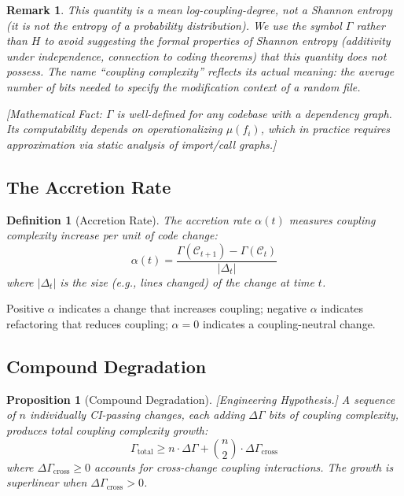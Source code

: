 \documentclass[11pt, a4paper, logo, copyright]{googledeepmind}
\newtheorem{definition}{Definition}[section]
\newtheorem{proposition}{Proposition}[section]
\newtheorem*{remark}{Remark}
\begin{document}
\begin{remark}
This quantity is a mean log-coupling-degree, not a Shannon entropy (it is not the entropy of a probability distribution). We use the symbol $\Gamma$ rather than $H$ to avoid suggesting the formal properties of Shannon entropy (additivity under independence, connection to coding theorems) that this quantity does not possess. The name ``coupling complexity'' reflects its actual meaning: the average number of bits needed to specify the modification context of a random file.
\end{remark}

\emph{[Mathematical Fact: $\Gamma$ is well-defined for any codebase with a dependency graph. Its computability depends on operationalizing $\mu(f_i)$, which in practice requires approximation via static analysis of import/call graphs.]}

\subsection{The Accretion Rate}

\begin{definition}[Accretion Rate]
\label{def:accretion-rate}
The \emph{accretion rate} $\alpha(t)$ measures coupling complexity increase per unit of code change:
\begin{equation}
\alpha(t) = \frac{\Gamma(\mathcal{C}_{t+1}) - \Gamma(\mathcal{C}_t)}{|\Delta_t|}
\end{equation}
where $|\Delta_t|$ is the size (e.g., lines changed) of the change at time $t$.
\end{definition}

Positive $\alpha$ indicates a change that increases coupling; negative $\alpha$ indicates refactoring that reduces coupling; $\alpha = 0$ indicates a coupling-neutral change.

\subsection{Compound Degradation}

\begin{proposition}[Compound Degradation]
\label{thm:compound-degradation}
\emph{[Engineering Hypothesis.]} A sequence of $n$ individually CI-passing changes, each adding $\Delta \Gamma$ bits of coupling complexity, produces total coupling complexity growth:
\begin{equation}
    \Gamma_{\text{total}} \geq n \cdot \Delta \Gamma + \binom{n}{2} \cdot \Delta \Gamma_{\text{cross}}
\end{equation}
where $\Delta \Gamma_{\text{cross}} \geq 0$ accounts for cross-change coupling interactions. The growth is superlinear when $\Delta \Gamma_{\text{cross}} > 0$.
\end{proposition}
\end{document}
